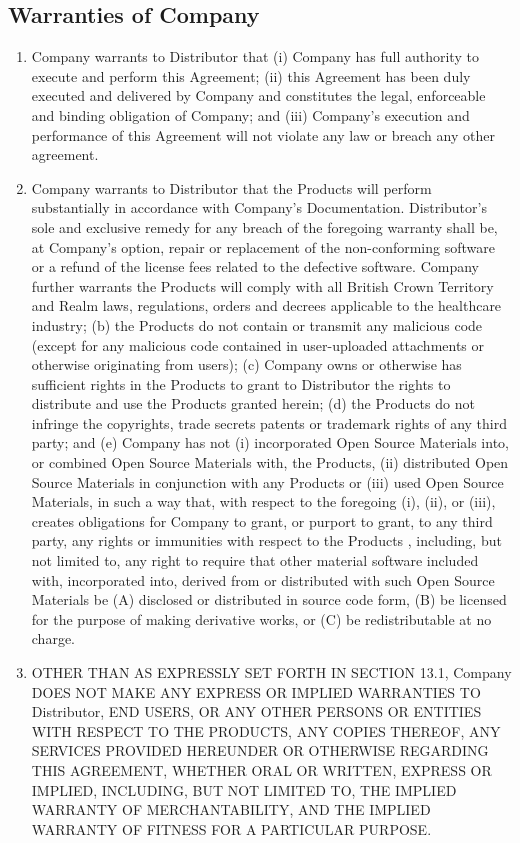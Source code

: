 \documentclass[letterpaper,10pt,english]{sphinxmanual}
\begin{document}
\subsection{Warranties of Company}
\label{\detokenize{warranties:warranties-of-company}}\begin{enumerate}
\item {} 
Company warrants to Distributor that (i) Company has full authority to execute and perform this Agreement; (ii) this Agreement has been duly executed and delivered by Company and constitutes the legal, enforceable and binding obligation of Company; and (iii) Company’s execution and performance of this Agreement will not violate any law or breach any other agreement.

\item {} 
Company warrants to Distributor that the Products will perform substantially in accordance with Company’s Documentation.  Distributor’s sole and exclusive remedy for any breach of the foregoing warranty shall be, at Company’s option, repair or replacement of the non-conforming software or a refund of the license fees related to the defective software.  Company further warrants  the Products will  comply with all British Crown Territory and Realm laws, regulations, orders and decrees applicable to the healthcare industry; (b)  the Products do not contain or transmit any malicious code (except for any malicious code contained in user-uploaded attachments or otherwise originating from users); (c) Company owns or otherwise has sufficient rights in the Products to grant to Distributor the rights to distribute and use the Products granted herein; (d) the Products do not infringe the copyrights, trade secrets patents or trademark rights of any third party; and (e) Company has not (i) incorporated Open Source Materials into, or combined Open Source Materials with, the Products, (ii) distributed Open Source Materials in conjunction with any Products or (iii) used Open Source Materials, in such a way that, with respect to the foregoing (i), (ii), or (iii), creates obligations for  Company to grant, or purport to grant, to any third party, any rights or immunities with respect to the Products , including, but not limited to, any right to require that other material software included with, incorporated into, derived from or distributed with such Open Source Materials be (A) disclosed or distributed in source code form, (B) be licensed for the purpose of making derivative works, or (C) be redistributable at no charge.

\item {} 
OTHER THAN AS EXPRESSLY SET FORTH IN SECTION 13.1, Company DOES NOT MAKE ANY EXPRESS OR IMPLIED WARRANTIES TO Distributor, END USERS, OR ANY OTHER PERSONS OR ENTITIES WITH RESPECT TO THE PRODUCTS, ANY COPIES THEREOF, ANY SERVICES PROVIDED HEREUNDER OR OTHERWISE REGARDING THIS AGREEMENT, WHETHER ORAL OR WRITTEN, EXPRESS OR IMPLIED, INCLUDING, BUT NOT LIMITED TO, THE IMPLIED WARRANTY OF MERCHANTABILITY, AND THE IMPLIED WARRANTY OF FITNESS FOR A PARTICULAR PURPOSE.

\end{enumerate}
\end{document}

